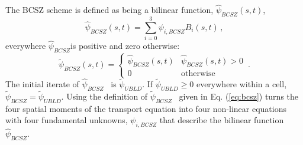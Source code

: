 \documentclass{mc2015}
\newcommand{\benum}{\begin{equation}} 			%
\newcommand{\eenum}{\end{equation}}
\newcommand{\eqt}[1]{Eq. (\ref{#1})}  %
\newcommand{\B}[1]{\ensuremath{{B_{#1} }}}
\newcommand{\BCSZ}{\ensuremath{\widetilde{\psi}_{BCSZ}}}
\newcommand{\BCSZH}{\ensuremath{\widehat{\psi}_{BCSZ}}}
\newcommand{\pec}{\, ,}
\newcommand{\pep}{\, .}
\begin{document}
The BCSZ scheme is defined as being a bilinear function, $\BCSZH(s,t)$, 
\benum
\BCSZH(s,t) = \sum_{i=0}^3{\psi_{i,BCSZ} \B{i}(s,t)} \pec
\eenum
everywhere \BCSZH is positive and zero otherwise:
\benum
\BCSZ(s,t) = \left \{ \begin{array}{ll}
\BCSZH(s,t) & \BCSZH(s,t) > 0 \\
0	& \text{otherwise}
\end{array}
\right. \pep
\label{eq:bcsz}
\eenum
The initial iterate of \BCSZH~ is $\widetilde{\psi}_{UBLD}$.  If $\widetilde{\psi}_{UBLD} \geq 0 $ everywhere within a cell, $\BCSZ = \widetilde{\psi}_{UBLD}$.
Using the definition of \BCSZ~ given in \eqt{eq:bcsz} turns the four spatial moments of the transport equation into four non-linear equations with four fundamental unknowns, $\psi_{i,BCSZ}$ that describe the bilinear function \BCSZH.
\end{document}
